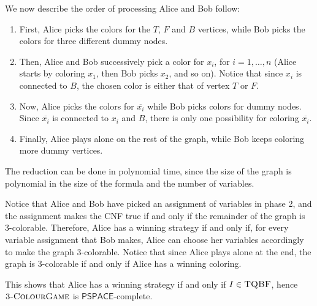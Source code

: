 \documentclass{article}
\newcommand{\TQBF}[0]{\textsc{TQBF}}
\newcommand{\game}[0]{\textsc{3-ColourGame}}
\newcommand{\PSPACE}[0]{\mathsf{PSPACE}}
\begin{document}
We now describe the order of processing Alice and Bob follow:
\begin{enumerate}
	\item First, Alice picks the colors for the $T$, $F$ and $B$ vertices, while Bob picks the colors for three different dummy nodes.
	\item Then, Alice and Bob successively pick a color for $x_i$, for $i = 1, \ldots, n$ (Alice starts by coloring $x_1$, then Bob picks $x_2$, and so on). Notice that since $x_i$ is connected to $B$, the chosen color is either that of vertex $T$ or $F$.
	\item Now, Alice picks the colors for $\overline{x_i}$ while Bob picks colors for dummy nodes. Since $\overline{x_i}$ is connected to $x_i$ and $B$, there is only one possibility for coloring $\overline{x_i}$.
	\item Finally, Alice plays alone on the rest of the graph, while Bob keeps coloring more dummy vertices.
\end{enumerate}
The reduction can be done in polynomial time, since the size of the graph is polynomial in the size of the formula and the number of variables.

Notice that Alice and Bob have picked an assignment of variables in phase 2, and the assignment makes the CNF true if and only if the remainder of the graph is 3-colorable. Therefore, Alice has a winning strategy if and only if, for every variable assignment that Bob makes, Alice can choose her variables accordingly to make the graph 3-colorable. Notice that since Alice plays alone at the end, the graph is 3-colorable if and only if Alice has a winning coloring.

This shows that Alice has a winning strategy if and only if $I \in \TQBF$, hence $\game$ is $\PSPACE$-complete.
\end{document}
